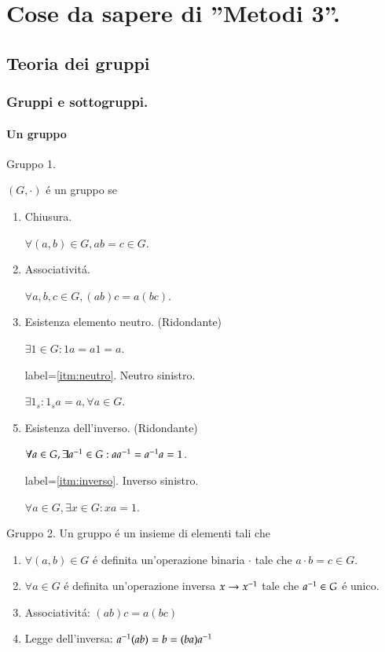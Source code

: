 \documentclass[oneside,12pt]{memoir}
\begin{document}
\part{Cose da sapere di ''Metodi 3''.}

\chapter{Teoria dei gruppi}
\PartialToc

\section{Gruppi e sottogruppi.}

\subsection{Un gruppo}

\begin{definition}{Gruppo 1.}

$(G,\cdot)$ \'e un gruppo se
\begin{enumerate}
\item Chiusura.

$\forall (a,b)\in G, ab=c\in G$.

\item Associativit\'a.

$\forall a,b,c\in G, (ab)c=a(bc)$.

\item Esistenza elemento neutro. (Ridondante)\label{itm:neutro}

$\exists 1\in G: 1a=a1=a$.

\item[label=\ref{itm:neutro}.] Neutro sinistro.

$\exists 1_s: 1_sa=a, \forall a\in G$.

\item Esistenza dell'inverso. (Ridondante)\label{itm:inverso}

$\forall a\in G, \exists {{a}^{-1}}\in G: a{{a}^{-1}}={{a}^{-1}}a=1$.

\item[label=\ref{itm:inverso}.] Inverso sinistro.

$\forall a\in G, \exists x\in G: xa=1$.

\end{enumerate}

\end{definition}

\begin{definition}{Gruppo 2.}
Un gruppo \'e un insieme di elementi tali che
\begin{enumerate}
\item $\forall (a,b)\in G$ \'e definita un'operazione binaria $\cdot$ tale che $a\cdot b=c\in G$.
\item $\forall a\in G$ \'e definita un'operazione inversa $x\to{{x}^{-1}}$ tale che ${{a}^{-1}}\in G$ \'e unico.
\item Associativit\'a: $(ab)c=a(bc)$
\item Legge dell'inversa: ${{a}^{-1}}(ab)=b=(ba){{a}^{-1}}$
\end{enumerate}
\end{definition}
\end{document}
